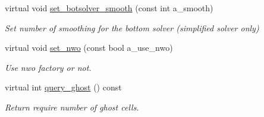 \begin{DoxyCompactItemize}
virtual void \hyperlink{classpoisson__multifluid__gmg_a95ce3cdae83f00f71f969fa76a589e2f}{set\+\_\+botsolver\+\_\+smooth} (const int a\+\_\+smooth)
\begin{DoxyCompactList}\small\item\em Set number of smoothing for the bottom solver (simplified solver only) \end{DoxyCompactList}\item 
virtual void \hyperlink{classpoisson__multifluid__gmg_a3cfbf1d74412284b139e8627a640eb3a}{set\+\_\+nwo} (const bool a\+\_\+use\+\_\+nwo)
\begin{DoxyCompactList}\small\item\em Use nwo factory or not. \end{DoxyCompactList}\item 
virtual int \hyperlink{classpoisson__multifluid__gmg_ac3d359654db7049ce74e6d3d68e10634}{query\+\_\+ghost} () const 
\begin{DoxyCompactList}\small\item\em Return require number of ghost cells. \end{DoxyCompactList}\end{DoxyCompactItemize}
